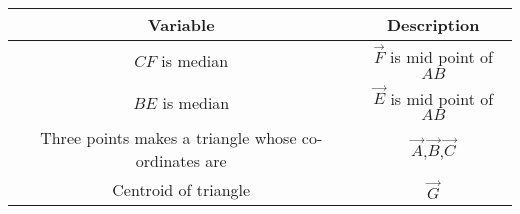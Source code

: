 \begin{tabular}[12pt]{ |c| c|}
    \hline
    \textbf{Variable} & \textbf{Description}\\ 
    \hline
    $CF$ is median & $\vec{F}$ is mid point of $AB$ \\
    \hline 
    $BE$ is median & $\vec{E}$ is mid point of $AB$ \\
    \hline
    Three points makes a triangle whose co-ordinates are & $\vec{A}$,$\vec{B}$,$\vec{C}$ \\
    \hline   
    Centroid of triangle & $\vec{G}$\\
    \hline
    \end{tabular}
